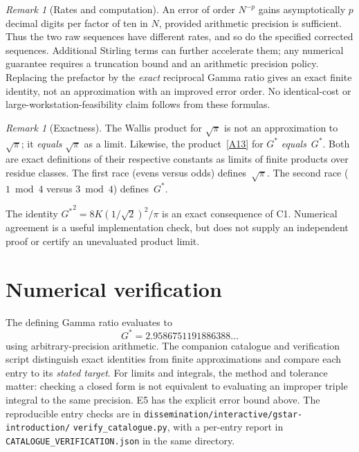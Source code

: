 \documentclass[12pt,reqno]{amsart}
\theoremstyle{definition}
\theoremstyle{remark}
\newtheorem{remark}[theorem]{Remark}
\newcommand{\Gstar}{G^{\!*}}
\begin{document}
\begin{remark}[Rates and computation]\label{rem:digits}
An error of order $N^{-p}$ gains asymptotically $p$ decimal digits per
factor of ten in $N$, provided arithmetic precision is sufficient.
Thus the two raw sequences have different rates, and so do the
specified corrected sequences. Additional Stirling terms can further
accelerate them; any numerical guarantee requires a truncation bound
and an arithmetic precision policy. Replacing the prefactor by the
\emph{exact} reciprocal Gamma ratio gives an exact finite identity,
not an approximation with an improved error order. No identical-cost
or large-workstation-feasibility claim follows from these formulas.
\end{remark}

\begin{remark}[Exactness]\label{rem:exact}
The Wallis product for $\sqrt{\pi}$ is not an approximation to $\sqrt{\pi}$;
it \emph{equals} $\sqrt{\pi}$ as a limit.
Likewise, the product~\eqref{A13} for ${\Gstar}$
\emph{equals}~${\Gstar}$.  Both are exact definitions of their
respective constants as limits of finite products over residue classes.
The first race (evens versus odds) defines~$\sqrt\pi$.
The second race ($1\bmod 4$ versus $3\bmod 4$) defines~${\Gstar}$.
\end{remark}

The identity ${\Gstar}^{2}=8K(1/\sqrt2)^2/\pi$ is an exact consequence
of C1. Numerical agreement is a useful implementation check, but does
not supply an independent proof or certify an unevaluated product limit.


\section{Numerical verification}\label{sec:numerical}

The defining Gamma ratio evaluates to
\[
  {\Gstar} = 2.9586751191886388\ldots
\]
using arbitrary-precision arithmetic. The companion catalogue and
verification script distinguish exact identities from finite
approximations and compare each entry to its \emph{stated target}.
For limits and integrals, the method and tolerance matter: checking a
closed form is not equivalent to evaluating an improper triple
integral to the same precision. E5 has the explicit error bound above.
The reproducible entry checks are in
\texttt{dissemination/interactive/gstar-introduction/}\allowbreak
\texttt{verify\_catalogue.py}, with a per-entry report in
\texttt{CATALOGUE\_VERIFICATION.json} in the same directory.
\end{document}
